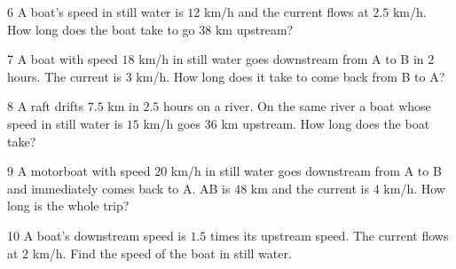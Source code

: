 \gap
\begin{probbox}{6}{\relax}
A boat's speed in still water is $12$ km/h and the current flows at $2.5$ km/h. How long does the boat take to go $38$ km upstream?
\end{probbox}
\gap
\begin{probbox}{7}{\relax}
A boat with speed $18$ km/h in still water goes downstream from A to B in $2$ hours. The current is $3$ km/h. How long does it take to come back from B to A?
\end{probbox}
\gap
\begin{probbox}{8}{\relax}
A raft drifts $7.5$ km in $2.5$ hours on a river. On the same river a boat whose speed in still water is $15$ km/h goes $36$ km upstream. How long does the boat take?
\end{probbox}
\gap
\begin{probbox}{9}{\relax}
A motorboat with speed $20$ km/h in still water goes downstream from A to B and immediately comes back to A. AB is $48$ km and the current is $4$ km/h. How long is the whole trip?
\end{probbox}
\gap
\begin{probbox}{10}{\relax}
A boat's downstream speed is $1.5$ times its upstream speed. The current flows at $2$ km/h. Find the speed of the boat in still water.
\end{probbox}
\gap
